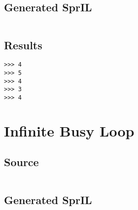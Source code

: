\documentclass[twoside]{report}
\begin{document}
\subsection{Generated SprIL}
\inputminted[tabsize=4,linenos,firstnumber=0]{text}{../../src/haskell/PP-project-2016/test/ifelse_gen.txt}
\subsection{Results}
\begin{verbatim}
>>> 4
>>> 5
>>> 4
>>> 3
>>> 4
\end{verbatim}

\section{Infinite Busy Loop}
\subsection{Source}
\inputminted[tabsize=4,linenos,firstnumber=1]{text}{../../src/haskell/PP-project-2016/test/infinite_busy_loop.shl}
\subsection{Generated SprIL}
\inputminted[tabsize=4,linenos,firstnumber=0]{text}{../../src/haskell/PP-project-2016/test/infinite_busy_loop_gen.txt}
\end{document}
